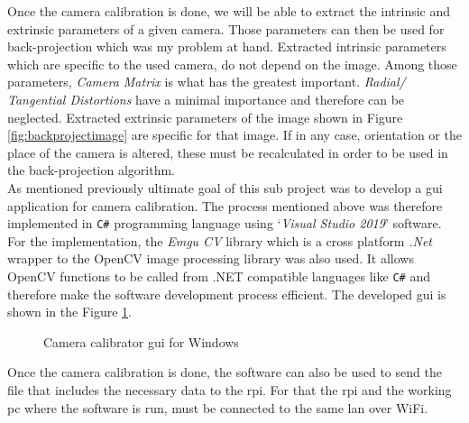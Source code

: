 \documentclass[a4paper,12pt]{report}
\begin{document}
Once the camera calibration is done, we will be able to extract the intrinsic and extrinsic parameters of a given camera. Those parameters can then be used for back-projection which was my problem at hand. Extracted intrinsic parameters which are specific to the  used  camera, do not depend on the image. Among those parameters, \textit{Camera Matrix} is what has the greatest important. \textit{Radial/ Tangential Distortions} have a minimal importance and therefore can be neglected. Extracted extrinsic parameters of the image shown in Figure \ref{fig:backprojectimage}  are specific for that image. If in any case, orientation or the place of the camera is altered, these must be recalculated in order to be used in the back-projection algorithm.\\
	
	
As mentioned previously ultimate goal of this sub project was to develop a \ac{gui} application for camera calibration. The process mentioned above was therefore implemented in {\tt C\#} programming language using `\textit{Visual Studio 2019}' software. For the implementation, the \textit{Emgu CV} library which is a cross platform \textit{.Net} wrapper to the OpenCV image processing library was also used. It allows OpenCV functions to be called from .NET compatible languages like {\tt C\#} and therefore make the software development process efficient. The developed \ac{gui} is shown in the Figure \ref{fig:calibgui}.

\begin{figure}[h]
	\centering
	\caption{Camera calibrator \ac{gui} for Windows}
	\label{fig:calibgui}
\end{figure}

Once the camera calibration is done, the software can also be used to send the file that includes the necessary data to the \ac{rpi}. For that the \ac{rpi} and the working \ac{pc} where the software is run,  must be connected to the same \ac{lan} over WiFi.
\end{document}

